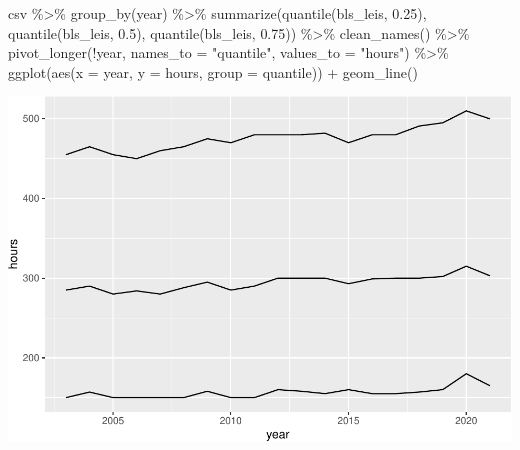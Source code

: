 \documentclass[
]{article}
\newenvironment{Shaded}{\begin{snugshade}}{\end{snugshade}}
\newcommand{\AttributeTok}[1]{\textcolor[rgb]{0.77,0.63,0.00}{#1}}
\newcommand{\FloatTok}[1]{\textcolor[rgb]{0.00,0.00,0.81}{#1}}
\newcommand{\FunctionTok}[1]{\textcolor[rgb]{0.00,0.00,0.00}{#1}}
\newcommand{\NormalTok}[1]{#1}
\newcommand{\SpecialCharTok}[1]{\textcolor[rgb]{0.00,0.00,0.00}{#1}}
\newcommand{\StringTok}[1]{\textcolor[rgb]{0.31,0.60,0.02}{#1}}
\begin{document}
\begin{Shaded}
\begin{Highlighting}[]
\NormalTok{csv }\SpecialCharTok{\%\textgreater{}\%}
  \FunctionTok{group\_by}\NormalTok{(year) }\SpecialCharTok{\%\textgreater{}\%}
  \FunctionTok{summarize}\NormalTok{(}\FunctionTok{quantile}\NormalTok{(bls\_leis, }\FloatTok{0.25}\NormalTok{), }\FunctionTok{quantile}\NormalTok{(bls\_leis, }\FloatTok{0.5}\NormalTok{), }\FunctionTok{quantile}\NormalTok{(bls\_leis, }\FloatTok{0.75}\NormalTok{)) }\SpecialCharTok{\%\textgreater{}\%}
  \FunctionTok{clean\_names}\NormalTok{() }\SpecialCharTok{\%\textgreater{}\%}
  \FunctionTok{pivot\_longer}\NormalTok{(}\SpecialCharTok{!}\NormalTok{year, }\AttributeTok{names\_to =} \StringTok{"quantile"}\NormalTok{, }\AttributeTok{values\_to =} \StringTok{"hours"}\NormalTok{) }\SpecialCharTok{\%\textgreater{}\%}
  \FunctionTok{ggplot}\NormalTok{(}\FunctionTok{aes}\NormalTok{(}\AttributeTok{x =}\NormalTok{ year, }\AttributeTok{y =}\NormalTok{ hours, }\AttributeTok{group =}\NormalTok{ quantile)) }\SpecialCharTok{+}
  \FunctionTok{geom\_line}\NormalTok{()}
\end{Highlighting}
\end{Shaded}

\includegraphics{Paper2_files/figure-latex/graphs-7.pdf}
\end{document}
